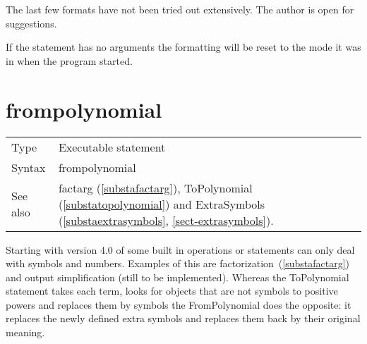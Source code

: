 


\noindent The last few formats have not been tried out extensively. The 
author is open for suggestions.
 

\noindent If the statement has no arguments the formatting will be reset to 
the mode it was in when the program started.\vspace{4mm}







\vspace{10mm}


\section{frompolynomial}
\label{substafrompolynomial}

\noindent \begin{tabular}{ll}
Type & Executable statement\\
Syntax & frompolynomial
\\ See also & factarg (\ref{substafactarg}), ToPolynomial 
(\ref{substatopolynomial}) and ExtraSymbols (\ref{substaextrasymbols},
\ref{sect-extrasymbols}).
\end{tabular} \vspace{4mm}

\noindent Starting with version 4.0 of \FORM{} some built in operations or
statements can only deal with symbols and numbers. Examples of this are 
factorization~(\ref{substafactarg}) and output simplification (still to be 
implemented). Whereas the ToPolynomial statement takes each term, looks for objects 
that are not symbols to positive powers and replaces them by symbols the 
FromPolynomial does the opposite: it replaces the newly defined extra 
symbols and replaces them back by their original meaning.
\vspace{10mm}

